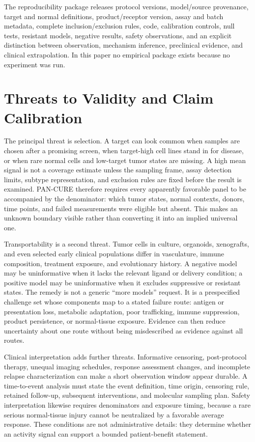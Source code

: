 \documentclass[10pt,conference]{IEEEtran}
\begin{document}
The reproducibility package releases protocol versions, model/source provenance, target and normal definitions, product/receptor version, assay and batch metadata, complete inclusion/exclusion rules, code, calibration controls, null tests, resistant models, negative results, safety observations, and an explicit distinction between observation, mechanism inference, preclinical evidence, and clinical extrapolation. In this paper no empirical package exists because no experiment was run.

\section{Threats to Validity and Claim Calibration}\label{sec:validity}
The principal threat is selection. A target can look common when samples are chosen after a promising screen, when target-high cell lines stand in for disease, or when rare normal cells and low-target tumor states are missing. A high mean signal is not a coverage estimate unless the sampling frame, assay detection limits, subtype representation, and exclusion rules are fixed before the result is examined. PAN-CURE therefore requires every apparently favorable panel to be accompanied by the denominator: which tumor states, normal contexts, donors, time points, and failed measurements were eligible but absent. This makes an unknown boundary visible rather than converting it into an implied universal one.

Transportability is a second threat. Tumor cells in culture, organoids, xenografts, and even selected early clinical populations differ in vasculature, immune composition, treatment exposure, and evolutionary history. A negative model may be uninformative when it lacks the relevant ligand or delivery condition; a positive model may be uninformative when it excludes suppressive or resistant states. The remedy is not a generic ``more models'' request. It is a prespecified challenge set whose components map to a stated failure route: antigen or presentation loss, metabolic adaptation, poor trafficking, immune suppression, product persistence, or normal-tissue exposure. Evidence can then reduce uncertainty about one route without being misdescribed as evidence against all routes.

Clinical interpretation adds further threats. Informative censoring, post-protocol therapy, unequal imaging schedules, response assessment changes, and incomplete relapse characterization can make a short observation window appear durable. A time-to-event analysis must state the event definition, time origin, censoring rule, retained follow-up, subsequent interventions, and molecular sampling plan. Safety interpretation likewise requires denominators and exposure timing, because a rare serious normal-tissue injury cannot be neutralized by a favorable average response. These conditions are not administrative details: they determine whether an activity signal can support a bounded patient-benefit statement.
\end{document}
